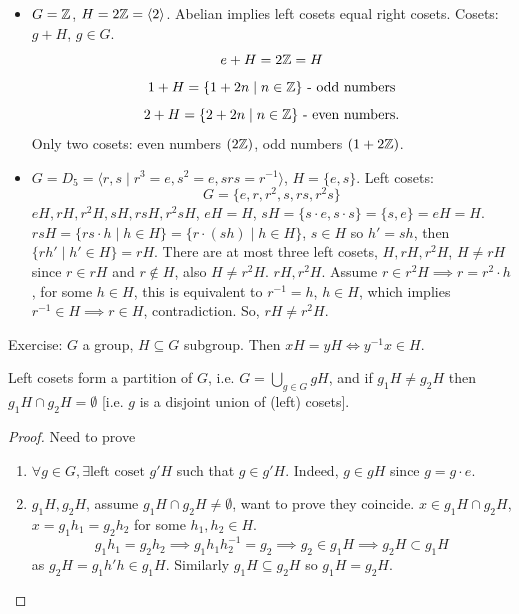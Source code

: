 \documentclass[10pt, a4paper]{article}
\begin{document}
\begin{example}
    \begin{itemize}
        \item 
        $G = \mathbb{Z}$,
        $H = 2\mathbb{Z} = \langle 2\rangle$.
        Abelian implies left cosets equal right cosets.
        Cosets:
        $g + H$,
        $g \in G$.
        \[
        e + H = 2\mathbb{Z} = H
        \]
        \[
        1 + H = \{1 + 2n \mid n \in \mathbb{Z}\}\text{ - odd numbers}
        \]
        \[
        2 + H = \{2 + 2n \mid n \in \mathbb{Z}\}\text{ - even numbers}.
        \]
        Only two cosets:
        even numbers $(2\mathbb{Z})$,
        odd numbers $(1 + 2\mathbb{Z})$.

        \item $G = D_5 = \langle r, s \mid r ^ 3 = e, s ^ 2 = e, srs = r ^ {-1}\rangle$,
        $H = \{e, s\}$.
        Left cosets:
        \[
        G = \{e, r, r ^ 2, s, rs, r ^ 2s\}
        \]
        $eH, rH, r ^ 2H, sH, rsH, r ^ 2sH$,
        $eH = H$,
        $sH = \{s\cdot e, s\cdot s\} = \{s, e\} = eH = H$.
        $rsH = \{rs \cdot h \mid h \in H\} = \{r \cdot (sh) \mid h \in H\}$,
        $s \in H$ so $h' = sh$,
        then $\{rh' \mid h' \in H\} = rH$.
        There are at most three left cosets,
        $H, rH, r ^ 2H$,
        $H \neq rH$ since $r \in rH$ and $r \notin H$,
        also $H \neq r ^ 2H$.
        $rH, r ^ 2H$.
        Assume $r \in r ^ 2H \implies r = r ^ 2\cdot h$,
        for some $h \in H$,
        this is equivalent to $r ^ {-1} = h$,
        $h \in H$,
        which implies $r ^ {-1} \in H \implies r \in H$,
        contradiction.
        So,
        $rH \neq r ^ 2H$.
    \end{itemize}
\end{example}

Exercise:
$G$ a group,
$H \subseteq G$ subgroup.
Then $xH = yH \iff y ^ {-1}x \in H$.

\begin{lemma}
    Left cosets form a partition of $G$,
    i.e. $G = \displaystyle\bigcup_{g \in G}gH$,
    and if $g_1H \neq g_2H$ then $g_1 H \cap g_2H = \emptyset$
    [i.e. $g$ is a disjoint union of
    (left)
    cosets].

    \begin{proof}
        Need to prove
        \begin{enumerate}[label = (\roman*)]
            \item $\forall g \in G, \exists \text{left coset } g'H$ such that $g \in g'H$.
            Indeed,
            $g \in gH$ since $g = g\cdot e$.

            \item $g_1H, g_2H$,
            assume $g_1H \cap g_2H \neq \emptyset$,
            want to prove they coincide.
            $x \in g_1H \cap g_2H$,
            $x = g_1h_1 = g_2h_2$ for some $h_1, h_2 \in H$.
            \[
            g_1h_1 = g_2h_2 \implies g_1h_1h_2 ^ {-1} = g_2 \implies g_2 \in g_1H \implies g_2H \subset g_1H
            \]
            as $g_2H = g_1h'h \in g_1H$.
            Similarly $g_1H \subseteq g_2H$ so $g_1H = g_2H$.
        \end{enumerate}
    \end{proof}
\end{lemma}
\end{document}

